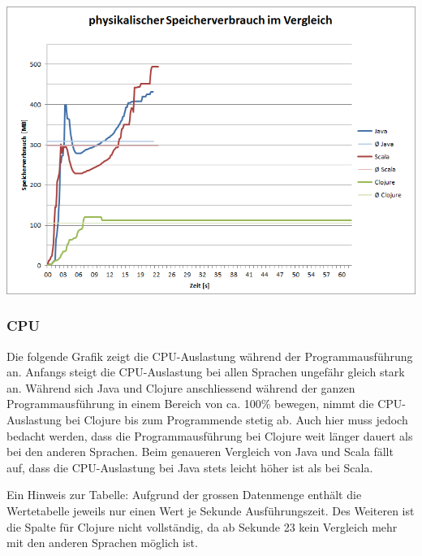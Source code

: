 \documentclass{fancydocument}
\begin{document}
\begin{center}
\includegraphics[width=\linewidth]{bilder/MemoryAll.png}
\end{center}
\subsubsection{CPU}
Die folgende Grafik zeigt die CPU-Auslastung während der Programmausführung an. Anfangs steigt die CPU-Auslastung bei allen Sprachen ungefähr gleich stark an. Während sich Java und Clojure anschliessend während der ganzen Programmausführung in einem Bereich von ca. 100\% bewegen, nimmt die CPU-Auslastung bei Clojure bis zum Programmende stetig ab. Auch hier muss jedoch bedacht werden, dass die Programmausführung bei Clojure weit länger dauert als bei den anderen Sprachen. Beim genaueren Vergleich von Java und Scala fällt auf, dass die CPU-Auslastung bei Java stets leicht höher ist als bei Scala.

\bigskip
\noindent
Ein Hinweis zur Tabelle: Aufgrund der grossen Datenmenge enthält die Wertetabelle jeweils nur einen Wert je Sekunde Ausführungszeit. Des Weiteren ist die Spalte für Clojure nicht vollständig, da ab Sekunde 23 kein Vergleich mehr mit den anderen Sprachen möglich ist.
\end{document}
